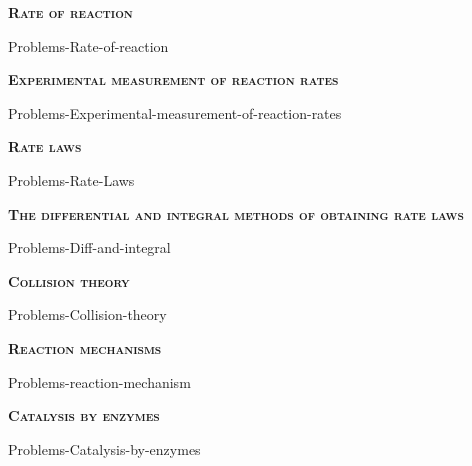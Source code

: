 \documentclass[main.tex]{subfiles}
\begin{document}
\newcommand\chapterlabel{Ch-kinetics}
\newpage
{}
\fancyhfoffset[E,O]{0pt}
\setlength{\columnsep}{30pt}
\begin{conclusion}
\iftoggle{chem121}{}{
\setcounter{chapter}{3}}
\end{conclusion}
\begin{multicols*}{2}\setcounter{numA}{1}  %


{\raggedright\textsc{\textbf{Rate of reaction }}\par} {Problems-Rate-of-reaction}
{\raggedright\textsc{\textbf{Experimental measurement of reaction rates }}\par} {Problems-Experimental-measurement-of-reaction-rates}

 


{\raggedright\textsc{\textbf{Rate laws }}\par} {Problems-Rate-Laws}
{\raggedright\textsc{\textbf{The differential and integral methods of obtaining rate laws }}\par}{Problems-Diff-and-integral}
{\raggedright\textsc{\textbf{Collision theory }}\par}{Problems-Collision-theory}
{\raggedright\textsc{\textbf{Reaction mechanisms }}\par}{Problems-reaction-mechanism}

{\raggedright\textsc{\textbf{Catalysis by enzymes }}\par}{Problems-Catalysis-by-enzymes}

\end{multicols*} \iftoggle{showfinalanswers}{
\newpage\fancyhfoffset[E,O]{0pt}
\begin{answerbox}
\begin{answersenvironment}
 \begin{localsize}{10}
{ \checkoddpage\ifoddpage    \else   \clearpage\thispagestyle{empty}\mbox{}\clearpage\fi
\Large \bf Answers}
\SetupExSheets{ headings = inline-nr , counter-format = qu) ,}
\providetoggle{printOddAnswers}\settoggle{printOddAnswers}{\printOddAnswers}\iftoggle{printOddAnswers}{\printsolutions[section] }{\printsolutions}
  \vspace{20cm}
 \end{localsize}
 \end{answersenvironment}
\end{answerbox}
}{}
\checkoddpage\ifoddpage   \clearpage\thispagestyle{empty}\mbox{}\clearpage \else   \fi
\end{document}
